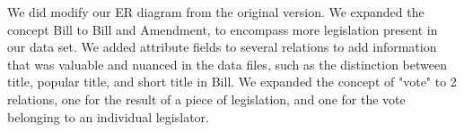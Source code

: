 \documentclass{article}
\begin{document}
We did modify our ER diagram from the original version. We expanded the concept Bill to Bill and Amendment, to encompass more legislation present in our data set. We added attribute fields to several relations to add information that was valuable and nuanced in the data files, such as the distinction between title, popular title, and short title in Bill. We expanded the concept of "vote" to 2 relations, one for the result of a piece of legislation, and one for the vote belonging to an individual legislator.
\end{document}
